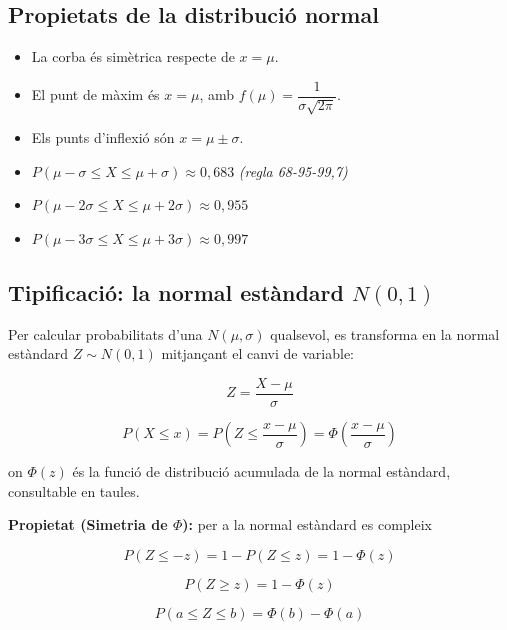 \subsection{Propietats de la distribució normal}

\begin{itemize}
\item La corba és simètrica respecte de $x = \mu$.
\item El punt de màxim és $x = \mu$, amb $f(\mu) = \dfrac{1}{\sigma\sqrt{2\pi}}$.
\item Els punts d'inflexió són $x = \mu \pm \sigma$.
\item $P(\mu - \sigma \le X \le \mu + \sigma) \approx 0{,}683$ \emph{(regla 68-95-99,7)}
\item $P(\mu - 2\sigma \le X \le \mu + 2\sigma) \approx 0{,}955$
\item $P(\mu - 3\sigma \le X \le \mu + 3\sigma) \approx 0{,}997$
\end{itemize}

\subsection{Tipificació: la normal estàndard $N(0, 1)$}

Per calcular probabilitats d'una $N(\mu, \sigma)$ qualsevol, es transforma en la normal estàndard $Z \sim N(0, 1)$ mitjançant el canvi de variable:

\begin{equation*}
Z = \frac{X - \mu}{\sigma}
\end{equation*}

\begin{equation*}
P(X \le x) = P\!\left(Z \le \frac{x - \mu}{\sigma}\right) = \Phi\!\left(\frac{x - \mu}{\sigma}\right)
\end{equation*}

on $\Phi(z)$ és la funció de distribució acumulada de la normal estàndard, consultable en taules.

\textbf{Propietat (Simetria de $\Phi$):} per a la normal estàndard es compleix

\begin{equation}
P(Z \le -z) = 1 - P(Z \le z) = 1 - \Phi(z)
\end{equation}

\begin{equation}
P(Z \ge z) = 1 - \Phi(z)
\end{equation}

\begin{equation}
P(a \le Z \le b) = \Phi(b) - \Phi(a)
\end{equation}

